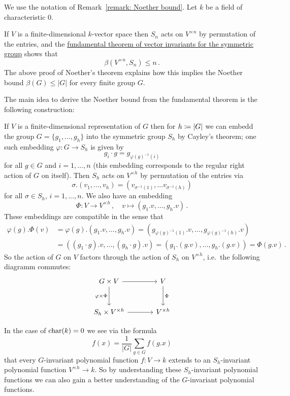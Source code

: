 \begin{fluff}
  We use the notation of Remark~\ref{remark: Noether bound}.
  Let $k$ be a field of characteristic $0$.
  
  If $V$ is a finite-dimensional $k$-vector space then $S_n$ acts on $V^{\times n}$ by permutation of the entries, and the \hyperref[theorem: fundamental theorem of vector invariants for the symmetric group]{fundamental theorem of vector invariants for the symmetric group} shows that
  \[
          \beta(V^{\times n}, S_n)
    \leq  n \,.
  \]
  The above proof of Noether’s theorem explains how this implies the Noether bound $\beta(G) \leq |G|$ for every finite group $G$.
  
  The main idea to derive the Noether bound from the fundamental theorem is the following construction:
  
  If $V$ is a finite-dimensional representation of $G$ then for $h \coloneqq |G|$ we can embedd the group $G = \{g_1, \dotsc, g_h\}$ into the symmetric group $S_h$ by Cayley’s theorem;
  one such embedding $\varphi \colon G \to S_h$ is given by
  \[
    g_i \cdot g
    = g_{\varphi(g)^{-1}(i)}
  \]
  for all $g \in G$ and $i = 1, \dotsc, n$ (this embedding corresponds to the regular right action of $G$ on itself).
  Then $S_h$ acts on $V^{\times h}$ by permutation of the entries via
  \[
      \sigma.(v_1, \dotsc, v_h)
    = (v_{\sigma^{-1}(1)}, \dotsc v_{\sigma^{-1}(h)})
  \]
  for all $\sigma \in S_h$, $i = 1, \dotsc, n$.
  We also have an embedding
  \[
            \Phi
    \colon  V
    \to     V^{\times h} \,,
    \quad   v
    \mapsto \left( g_1.v, \dotsc, g_h.v \right) \,.
  \]
  These embeddings are compatible in the sense that
  \begin{align*}
        \varphi(g).\Phi(v)
    &=  \varphi(g).(g_1.v, \dotsc, g_h.v)
     =  \left( g_{\varphi(g)^{-1}(1)}.v, \dotsc, g_{\varphi(g)^{-1}(h)}.v \right) \\
    &=  ( (g_1 \cdot g).v, \dotsc, (g_h \cdot g).v )
     =  ( g_1.(g.v), \dotsc, g_h.(g.v) )
     =  \Phi(g.v) \,.
  \end{align*}
  So the action of $G$ on $V$ factors through the action of $S_h$ on $V^{\times h}$, i.e.\ the following diagramm commutes:
  \[
    \begin{tikzcd}[sep = large]
        G \times V
        \arrow{r}
        \arrow{d}[left]{\varphi \times \Phi}
      & V
        \arrow{d}[right]{\Phi}
      \\
        S_h \times V^{\times h}
        \arrow{r}
      & V^{\times h}
    \end{tikzcd}
  \]

  
  In the case of $\operatorname{char}(k) = 0$ we see via the formula
  \[
      f(x)
    = \frac{1}{|G|} \sum_{g \in G} f(g.x)
  \]
  that every $G$-invariant polynomial function $f \colon V \to k$ extends to an $S_h$-invariant polynomial function $V^{\times h} \to k$.
  So by understanding these $S_h$-invariant polynomial functions we can also gain a better understanding of the $G$-invariant polynomial functions.
\end{fluff}




